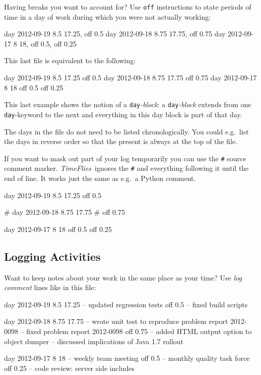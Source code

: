 \documentclass[11pt]{article}
\newcommand{\timeflies}{\emph{TimeFlies}}
\begin{document}
Having breaks you want to account for? Use \verb-off- instructions to state periods of time in a day of work during which you were not actually working:

\begin{inputfile}
day 2012-09-19 8.5 17.25, off 0.5
day 2012-09-18 8.75 17.75, off 0.75
day 2012-09-17 8 18, off 0.5, off 0.25
\end{inputfile}

This last file is equivalent to the following:

\begin{inputfile}
day 2012-09-19 8.5 17.25
off 0.5
day 2012-09-18 8.75 17.75
off 0.75
day 2012-09-17 8 18
off 0.5
off 0.25
\end{inputfile}

This last example shows the notion of a \verb-day-\emph{-block}: a \verb-day-\emph{-block} extends
from one \verb-day--keyword to the next and everything in this day block is part of that day.

The days in the file do not need to be listed chronologically. You could e.g.\ list the days in reverse order so that the present is always at the top of the file.

If you want to mask out part of your log temporarily you can use the \verb-#- source comment marker. \timeflies\ ignores the \verb-#- and everything following it until the end of line. It works just the same as e.g.\ a Python comment.

\begin{inputfile}
day 2012-09-19 8.5 17.25
off 0.5

# day 2012-09-18 8.75 17.75
# off 0.75

day 2012-09-17 8 18
off 0.5
off 0.25
\end{inputfile}

\subsection{Logging Activities}

Want to keep notes about your work in the same place as your time? Use \emph{log comment} lines like in this file:

\begin{inputfile}
day 2012-09-19 8.5 17.25
-- updated regression tests
off 0.5
-- fixed build scripts

day 2012-09-18 8.75 17.75
-- wrote unit test to reproduce problem report 2012-0098
-- fixed problem report 2012-0098
off 0.75
-- added HTML output option to object dumper
-- discussed implications of Java 1.7 rollout

day 2012-09-17 8 18
-- weekly team meeting
off 0.5
-- monthly quality task force 
off 0.25
-- code review: server side includes
\end{inputfile}
\end{document}
